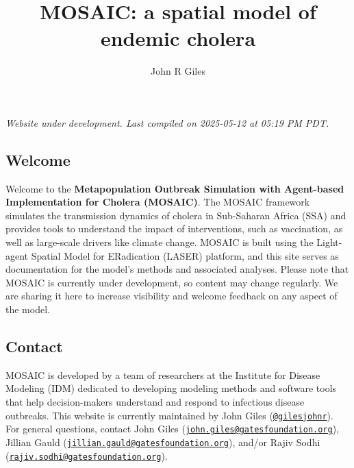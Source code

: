 \documentclass[
]{book}
\title{MOSAIC: a spatial model of endemic cholera}
\author{John R Giles}
\date{}
\begin{document}
\maketitle

{
\setcounter{tocdepth}{1}
\tableofcontents
}
\chapter*{}\label{section}

\hfill\break

{\emph{
Website under development. Last compiled on 2025-05-12 at 05:19 PM PDT.
}}

\section*{Welcome}\label{welcome}

Welcome to the \textbf{Metapopulation Outbreak Simulation with Agent-based Implementation for Cholera (MOSAIC)}. The MOSAIC framework simulates the transmission dynamics of cholera in Sub-Saharan Africa (SSA) and provides tools to understand the impact of interventions, such as vaccination, as well as large-scale drivers like climate change. MOSAIC is built using the Light-agent Spatial Model for ERadication (LASER) platform, and this site serves as documentation for the model's methods and associated analyses. Please note that MOSAIC is currently under development, so content may change regularly. We are sharing it here to increase visibility and welcome feedback on any aspect of the model.

\section*{Contact}\label{contact}

MOSAIC is developed by a team of researchers at the Institute for Disease Modeling (IDM) dedicated to developing modeling methods and software tools that help decision-makers understand and respond to infectious disease outbreaks. This website is currently maintained by John Giles (\href{https://github.com/gilesjohnr}{\texttt{@gilesjohnr}}). For general questions, contact John Giles (\href{mailto:john.giles@gatesfoundation.org}{\nolinkurl{john.giles@gatesfoundation.org}}), Jillian Gauld (\href{mailto:jillian.gauld@gatesfoundation.org}{\nolinkurl{jillian.gauld@gatesfoundation.org}}), and/or Rajiv Sodhi (\href{mailto:rajiv.sodhi@gatesfoundation.org}{\nolinkurl{rajiv.sodhi@gatesfoundation.org}}).
\end{document}
